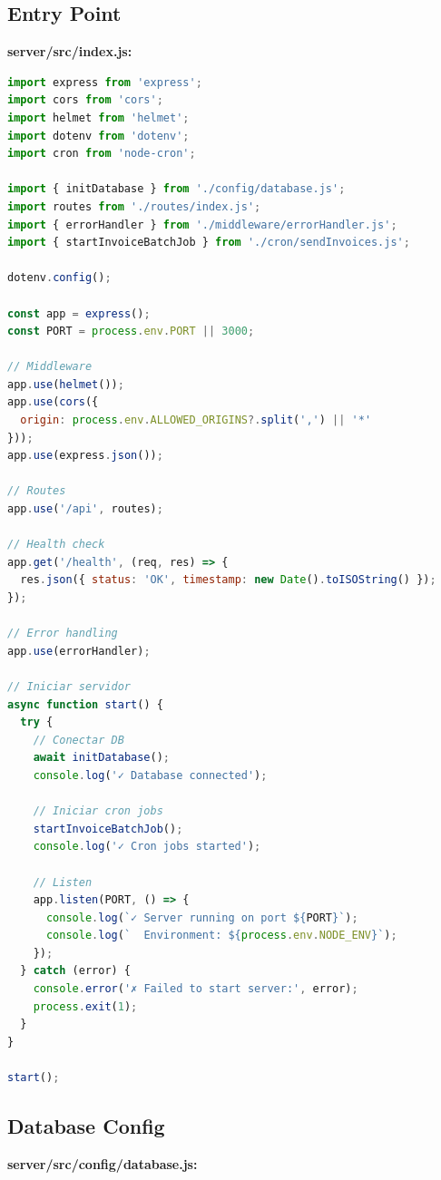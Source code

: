 \documentclass[11pt,a4paper]{article}
\begin{document}
\subsection{Entry Point}

\textbf{server/src/index.js:}

\begin{lstlisting}[language=JavaScript]
import express from 'express';
import cors from 'cors';
import helmet from 'helmet';
import dotenv from 'dotenv';
import cron from 'node-cron';

import { initDatabase } from './config/database.js';
import routes from './routes/index.js';
import { errorHandler } from './middleware/errorHandler.js';
import { startInvoiceBatchJob } from './cron/sendInvoices.js';

dotenv.config();

const app = express();
const PORT = process.env.PORT || 3000;

// Middleware
app.use(helmet());
app.use(cors({
  origin: process.env.ALLOWED_ORIGINS?.split(',') || '*'
}));
app.use(express.json());

// Routes
app.use('/api', routes);

// Health check
app.get('/health', (req, res) => {
  res.json({ status: 'OK', timestamp: new Date().toISOString() });
});

// Error handling
app.use(errorHandler);

// Iniciar servidor
async function start() {
  try {
    // Conectar DB
    await initDatabase();
    console.log('✓ Database connected');
    
    // Iniciar cron jobs
    startInvoiceBatchJob();
    console.log('✓ Cron jobs started');
    
    // Listen
    app.listen(PORT, () => {
      console.log(`✓ Server running on port ${PORT}`);
      console.log(`  Environment: ${process.env.NODE_ENV}`);
    });
  } catch (error) {
    console.error('✗ Failed to start server:', error);
    process.exit(1);
  }
}

start();
\end{lstlisting}

\newpage

\subsection{Database Config}

\textbf{server/src/config/database.js:}
\end{document}
